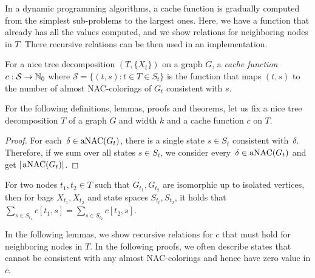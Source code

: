 In a dynamic programming algorithms, a cache function is gradually computed
from the simplest sub-problems to the largest ones.
Here, we have a function that already has all the values computed,
and we show relations for neighboring nodes in \( T \).
There recursive relations can be then used in an implementation.
%
\begin{definition}
	For a nice tree decomposition \( (T, \{X_t\}) \) on a graph \( G \),
	a \emph{cache function} \( c: \mathcal{S} \to \mathbb{N}_0 \)
	where \( \mathcal{S} = \{ (t,s): t \in T \in S_t \} \)
	is the function that maps \( (t, s) \)
	to the number of almost NAC-colorings of \( G_t \) consistent with \( s \).
\end{definition}
%
For the following definitions, lemmas, proofs and theorems, let us fix
a nice tree decomposition \( T \) of a graph \( G \) and width \( k \)
and a cache function \( c \) on \( T \).
%
%
\begin{proof}
	For each~\( \delta \in \operatorname{aNAC}(G_t) \),
	there is a single state \( s \in S_t \) consistent with~\( \delta \).
	Therefore, if we sum over all states \( s \in S_t \),
	we consider every~\( \delta \in \operatorname{aNAC}(G_t) \) and get \( |\operatorname{aNAC}(G_t)| \).
\end{proof}
%
\begin{observation}
	For two nodes \( t_1, t_2 \in T \) such that \( G_{t_1}, G_{t_2} \)
	are isomorphic up to isolated vertices,
	then for bags \( X_{t_1}, X_{t_2} \) and state spaces \( S_{t_t}, S_{t_2} \),
	it holds that \( \sum_{s \in S_{t_1}} c[t_1, s] = \sum_{s \in S_{t_2}} c[t_2, s] \).
\end{observation}
%
%

In the following lemmas, we show recursive relations for \( c \) that must hold
for neighboring nodes in \( T \).
%
In the following proofs,
we often describe states that cannot be consistent with
any almost NAC-colorings and hence have zero value in \( c \).


